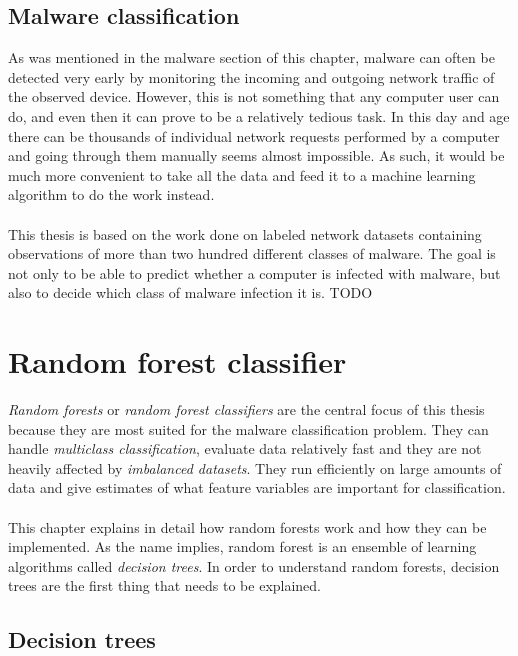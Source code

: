 \documentclass[11pt]{article}
\begin{document}
    \subsection{Malware classification}
      As was mentioned in the malware section of this chapter, malware can often be detected very early by monitoring the incoming and outgoing network traffic of the observed device. However, this is not something that any computer user can do, and even then it can prove to be a relatively tedious task. In this day and age there can be thousands of individual network requests performed by a computer and going through them manually seems almost impossible. As such, it would be much more convenient to take all the data and feed it to a machine learning algorithm to do the work instead.
      \\~\\
      This thesis is based on the work done on labeled network datasets containing observations of more than two hundred different classes of malware. The goal is not only to be able to predict whether a computer is infected with malware, but also to decide which class of malware infection it is.
      {\color{red}TODO}
      
  \newpage
  \section{Random forest classifier}
    {\it Random forests} or {\it random forest classifiers} are the central focus of this thesis because they are most suited for the malware classification problem. They can handle {\it multiclass classification}, evaluate data relatively fast and they are not heavily affected by {\it imbalanced datasets}. \cite{brabec} They run efficiently on large amounts of data and give estimates of what feature variables are important for classification. \cite{breiman}
    \\~\\
    This chapter explains in detail how random forests work and how they can be implemented. As the name implies, random forest is an ensemble of learning algorithms called {\it decision trees}. In order to understand random forests, decision trees are the first thing that needs to be explained.
    \subsection{Decision trees}
\end{document}
